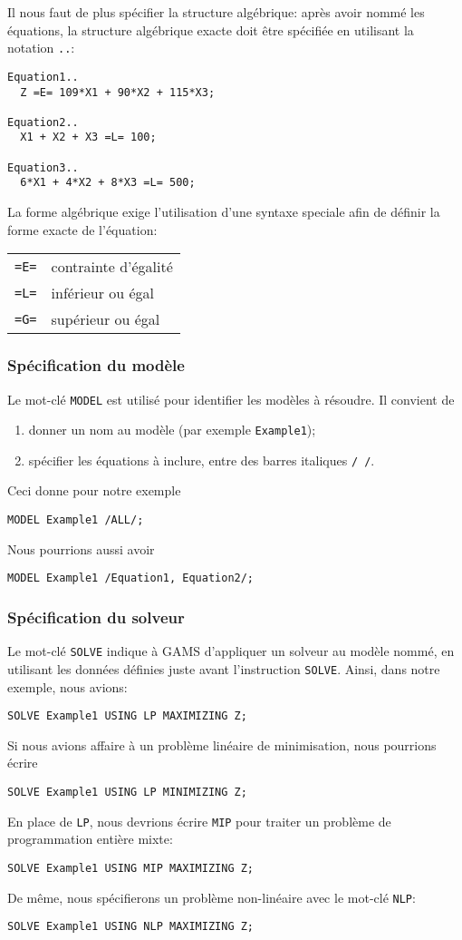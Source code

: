 Il nous faut de plus spécifier la structure algébrique: après avoir nommé les équations, la structure algébrique exacte doit être spécifiée en utilisant la notation \verb|..|:
\begin{verbatim}
Equation1..
  Z =E= 109*X1 + 90*X2 + 115*X3;

Equation2..
  X1 + X2 + X3 =L= 100;

Equation3..
  6*X1 + 4*X2 + 8*X3 =L= 500;
\end{verbatim}
La forme algébrique exige l'utilisation d'une syntaxe speciale afin de définir la forme exacte de l'équation:\\
\begin{tabular}{ll}
\verb|=E=| & contrainte d'égalité \\
\verb|=L=| & inférieur ou égal \\
\verb|=G=| & supérieur ou égal
\end{tabular}

\subsubsection{Spécification du modèle}

Le mot-clé \verb|MODEL| est utilisé pour identifier les modèles à résoudre.
Il convient de
\begin{enumerate}
\item
donner un nom au modèle (par exemple \verb|Example1|);
\item
spécifier les équations à inclure, entre des barres italiques \verb|/ /|.
\end{enumerate}
Ceci donne pour notre exemple
\begin{verbatim}
MODEL Example1 /ALL/;
\end{verbatim}
Nous pourrions aussi avoir
\begin{verbatim}
MODEL Example1 /Equation1, Equation2/;
\end{verbatim}

\subsubsection{Spécification du solveur}

Le mot-clé \verb|SOLVE| indique à GAMS d'appliquer un solveur au modèle nommé, en utilisant les données définies juste avant l'instruction \verb|SOLVE|.
Ainsi, dans notre exemple, nous avions:
\begin{verbatim}
SOLVE Example1 USING LP MAXIMIZING Z;
\end{verbatim}
Si nous avions affaire à un problème linéaire de minimisation, nous pourrions écrire
\begin{verbatim}
SOLVE Example1 USING LP MINIMIZING Z;
\end{verbatim}
En place de \verb|LP|, nous devrions écrire \verb|MIP| pour traiter un problème de programmation entière mixte:
\begin{verbatim}
SOLVE Example1 USING MIP MAXIMIZING Z;
\end{verbatim}
De même, nous spécifierons un problème non-linéaire avec le mot-clé \verb|NLP|:
\begin{verbatim}
SOLVE Example1 USING NLP MAXIMIZING Z;
\end{verbatim}

